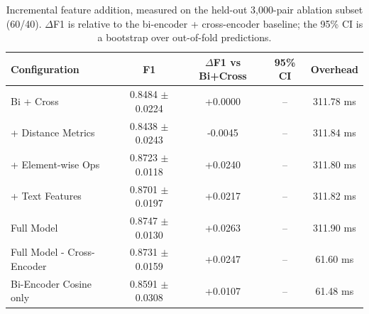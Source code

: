 \begin{table}[htbp]
\centering
\caption{Incremental feature addition, measured on the held-out 3,000-pair ablation subset (60/40). $\Delta$F1 is relative to the bi-encoder + cross-encoder baseline; the 95\% CI is a bootstrap over out-of-fold predictions.}
\label{tab:ablation_incremental}
\begin{tabular}{lcccc}
\toprule
\textbf{Configuration} & \textbf{F1} & \textbf{$\Delta$F1 vs Bi+Cross} & \textbf{95\% CI} & \textbf{Overhead} \\
\midrule
Bi + Cross & 0.8484 $\pm$ 0.0224 & +0.0000 & -- & 311.78 ms \\
+ Distance Metrics & 0.8438 $\pm$ 0.0243 & -0.0045 & -- & 311.84 ms \\
+ Element-wise Ops & 0.8723 $\pm$ 0.0118 & +0.0240 & -- & 311.80 ms \\
+ Text Features & 0.8701 $\pm$ 0.0197 & +0.0217 & -- & 311.82 ms \\
Full Model & 0.8747 $\pm$ 0.0130 & +0.0263 & -- & 311.90 ms \\
Full Model - Cross-Encoder & 0.8731 $\pm$ 0.0159 & +0.0247 & -- & 61.60 ms \\
Bi-Encoder Cosine only & 0.8591 $\pm$ 0.0308 & +0.0107 & -- & 61.48 ms \\
\bottomrule
\end{tabular}
\end{table}
